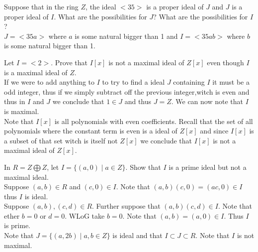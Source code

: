 \documentclass[12pt]{article}
\makeatletter
\theoremstyle{homework}
\newenvironment{exercise}[1]
{\def\@currentlabel{#1}\exercisecore}
{\endexercisecore}
\makeatother
\begin{document}
\begin{exercise}{14.18}
Suppose that in the ring $Z$, the ideal $<35>$ is a proper ideal of $J$ and $J$ is a proper ideal of $I$. What are the possibilities for $J$? What are the possibilities for $I$?\\
$J=<35a>$ where $a$ is some natural bigger than 1 and $I=<35ab>$ where $b$ is some natural bigger than 1.
\end{exercise}

\begin{exercise}{14.22}
Let $I = <2>$. Prove that $I[x]$ is not a maximal ideal of $Z[x]$ even though $I$ is a maximal ideal of $Z$.\\
If we were to add anything to $I$ to try to find a ideal $J$ containing $I$ it must be a odd integer, thus if we simply subtract off the previous integer,witch is even and thus in $I$ and $J$ we conclude that $1\in J$ and thus $J=Z$.  We can now note that $I$ is maximal.\\
Note that $I[x]$ is all polynomials with even coefficients.  Recall that the set of all polynomials where the constant term is even is a ideal of $Z[x]$ and since $I[x]$ is a subset of that set witch is itself not $Z[x]$ we conclude that $I[x]$ is not a maximal ideal of $Z[x]$.
\end{exercise}

\begin{exercise}{14.35}
In $R=Z \bigoplus Z$, let $I = \{(a, 0) \mid a \in Z\}$. Show that $I$ is a prime ideal but
not a maximal ideal.\\
Suppose $(a,b)\in R$ and $(c,0)\in I$.  Note that $(a,b)(c,0)=(ac,0)\in I$ thus $I$ is ideal.\\
Suppose $(a,b),(c,d)\in R$.  Further suppose that $(a,b)(c,d)\in I$.  Note that ether $b=0$ or $d=0$.  WLoG take $b=0$.  Note that $(a,b)=(a,0)\in I$.  Thus $I$ is prime.\\
Note that $J=\{(a,2b)\mid a,b\in Z\}$ is ideal and that $I\subset J\subset R$.  Note that $I$ is not maximal.
\end{exercise}
\end{document}
